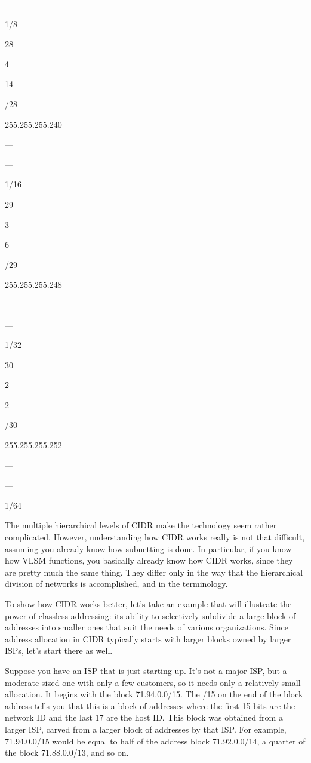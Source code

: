 ---

1/8

28

4

14

/28

255.255.255.240

---

---

1/16

29

3

6

/29

255.255.255.248

---

---

1/32

30

2

2

/30

255.255.255.252

---

---

1/64



The multiple hierarchical levels of CIDR make the technology seem rather
complicated. However, understanding how CIDR works really is not that
difficult, assuming you already know how subnetting is done. In
particular, if you know how VLSM functions, you basically already know
how CIDR works, since they are pretty much the same thing. They differ
only in the way that the hierarchical division of networks is
accomplished, and in the terminology.

To show how CIDR works better, let's take an example that will
illustrate the power of classless
addressing:
its ability to selectively subdivide a large block of addresses into
smaller ones that suit the needs of various organizations. Since address
allocation in CIDR typically starts with larger blocks owned by larger
ISPs, let's start there as well.

Suppose you have an ISP that is just starting up. It's not a major ISP,
but a moderate-sized one with only a few customers, so it needs only a
relatively small allocation. It begins with the block 71.94.0.0/15. The
/15 on the end of the block address tells you that this is a block of
addresses where the first 15 bits are the network ID and the last 17 are
the host ID. This block was obtained from a larger ISP, carved from a
larger block of addresses by that ISP. For example, 71.94.0.0/15 would
be equal to half of the address block 71.92.0.0/14, a quarter of the
block 71.88.0.0/13, and so on.

